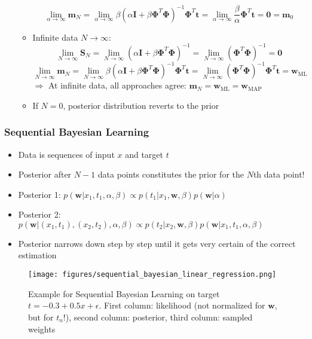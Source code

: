 \begin{itemize}
\begin{itemize}
		$$\lim\limits_{\alpha\to\infty} \bm{m}_N = \lim\limits_{\alpha\to\infty} \beta\left(\alpha\bm{I}+\beta \bm{\Phi}^{T}\bm{\Phi}\right)^{-1}\bm{\Phi}^T \bm{t} = \lim\limits_{\alpha\to\infty} \frac{\beta}{\alpha}\bm{\Phi}^T\bm{t} = \bm{0} = \bm{m}_{0}$$
		\item Infinite data $N\to\infty$:
		$$\lim\limits_{N\to\infty} \bm{S}_N = \lim\limits_{N\to\infty} \left(\alpha\bm{I}+\beta \bm{\Phi}^{T}\bm{\Phi}\right)^{-1} = \lim\limits_{N\to\infty} \left(\bm{\Phi}^{T}\bm{\Phi}\right)^{-1} = \bm{0}$$
		$$\lim\limits_{N\to\infty} \bm{m}_N = \lim\limits_{N\to\infty} \beta\left(\alpha\bm{I}+\beta \bm{\Phi}^{T}\bm{\Phi}\right)^{-1}\bm{\Phi}^T \bm{t} = \lim\limits_{N\to\infty} \left(\bm{\Phi}^T\bm{\Phi}\right)^{-1}\bm{\Phi}^T\bm{t} = \bm{w}_{\text{ML}}$$
		$\Rightarrow$ At infinite data, all approaches agree: $\bm{m}_N = \bm{w}_{\text{ML}} = \bm{w}_{\text{MAP}}$
		\item If $N=0$, posterior distribution reverts to the prior
	\end{itemize}
\end{itemize}

\subsubsection{Sequential Bayesian Learning}
\begin{itemize}
	\item Data is sequences of input $x$ and target $t$
	\item Posterior after $N-1$ data points constitutes the prior for the $N$th data point!
	\item Posterior 1: $p(\bm{w}|x_1,t_1,\alpha,\beta)\propto p(t_1|x_1,\bm{w},\beta)p(\bm{w}|\alpha)$
	\item Posterior 2: $p\left(\bm{w}|(x_1,t_1),(x_2,t_2),\alpha,\beta\right)\propto p(t_2|x_2,\bm{w},\beta)p(\bm{w}|x_1,t_1,\alpha,\beta)$
	\item Posterior narrows down step by step until it gets very certain of the correct estimation 
\end{itemize}
\begin{figure}[ht]
\centering
\texttt{[image: figures/sequential\_bayesian\_linear\_regression.png]}
\caption{Example for Sequential Bayesian Learning on target $t=-0.3+0.5x+\epsilon$. First column: likelihood (not normalized for $\bm{w}$, but for $t_n$!), second column: posterior, third column: sampled weights}
\end{figure}
